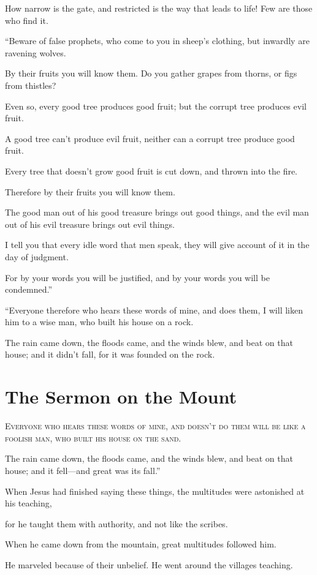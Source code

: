 How narrow is the gate, and restricted is the way that leads to life! Few are those who find it.

“Beware of false prophets, who come to you in sheep’s clothing, but inwardly are ravening wolves.

By their fruits you will know them. Do you gather grapes from thorns, or figs from thistles?

Even so, every good tree produces good fruit; but the corrupt tree produces evil fruit.

A good tree can’t produce evil fruit, neither can a corrupt tree produce good fruit.

Every tree that doesn’t grow good fruit is cut down, and thrown into the fire.

Therefore by their fruits you will know them.

The good man out of his good treasure brings out good things, and the evil man out of his evil treasure brings out evil things.

I tell you that every idle word that men speak, they will give account of it in the day of judgment.

For by your words you will be justified, and by your words you will be condemned.”

“Everyone therefore who hears these words of mine, and does them, I will liken him to a wise man, who built his house on a rock.

The rain came down, the floods came, and the winds blew, and beat on that house; and it didn’t fall, for it was founded on the rock.


\clearpage \section*{The Sermon on the Mount}
\chapterornament

\lettrine{E}{veryone who hears these words of mine, and doesn’t do them will be like a foolish man, who built his house on the sand.}

The rain came down, the floods came, and the winds blew, and beat on that house; and it fell—and great was its fall.”

When Jesus had finished saying these things, the multitudes were astonished at his teaching,

for he taught them with authority, and not like the scribes.

When he came down from the mountain, great multitudes followed him.

He marveled because of their unbelief. He went around the villages teaching.

